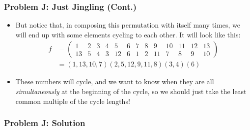 \begin{frame}
  \frametitle{Problem J: Just Jingling (Cont.)}
  \begin{itemize}
    \item But notice that, in composing this permutation with itself many times, we will end up with 
      some elements cycling to each other. It will look like this:
      \begin{align*}
        f &= \begin{pmatrix} 1 & 2 & 3 & 4 & 5 & 6 & 7 & 8 & 9 & 10 & 11 & 12 & 13\\
      13 & 5 & 4 & 3 & 12 & 6 & 1 & 2 & 11 & 7 & 8 & 9 & 10 \end{pmatrix}\\
        &= (1,13,10,7)(2,5,12,9,11,8)(3,4)(6)
      \end{align*}
    \item These numbers will cycle, and we want to know when they are all \textit{simultaneously}
      at the beginning of the cycle, so we should just take the least common multiple of the cycle lengths!
  \end{itemize}
\end{frame}

\begin{frame}
  \frametitle{Problem J: Solution}
\end{frame}
